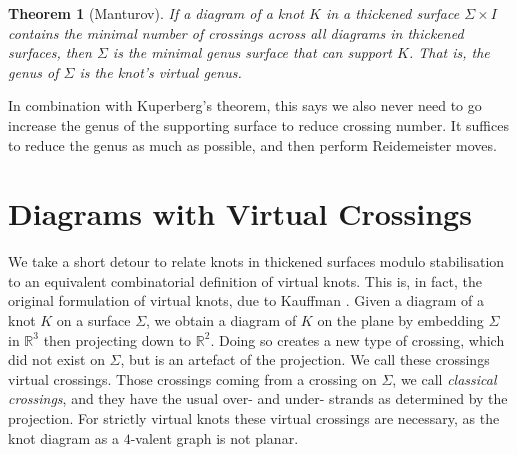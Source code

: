 \documentclass[12pt]{report}
\newcommand{\R}{\mathbb{R}}
\newtheorem*{theorem}{Theorem}
\theoremstyle{upright}
\begin{document}
\begin{theorem}[Manturov]
	If a diagram of a knot $K$ in a thickened surface $\Sigma \times I$ contains the minimal number of crossings across all diagrams in thickened surfaces, then $\Sigma$ is the minimal genus surface that can support $K$. That is, the genus of $\Sigma$ is the knot's virtual genus.
\end{theorem}
In combination with Kuperberg's theorem, this says we also never need to go increase the genus of the supporting surface to reduce crossing number. It suffices to reduce the genus as much as possible, and then perform Reidemeister moves.


\section{Diagrams with Virtual Crossings}

We take a short detour to relate knots in thickened surfaces modulo stabilisation to an equivalent combinatorial definition of virtual knots. This is, in fact, the original formulation of virtual knots, due to Kauffman \cite{virtual-knot-theory}. Given a diagram of a knot $K$ on a surface $\Sigma$, we obtain a diagram of $K$ on the plane by embedding $\Sigma$ in $\R^{3}$ then projecting down to $\R^{2}$. Doing so creates a new type of crossing, which did not exist on $\Sigma$, but is an artefact of the projection. We call these crossings virtual crossings. Those crossings coming from a crossing on $\Sigma$, we call \textit{classical crossings}, and they have the usual over- and under- strands as determined by the projection. For strictly virtual knots these virtual crossings are necessary, as the knot diagram as a $4$-valent graph is not planar.
\end{document}
